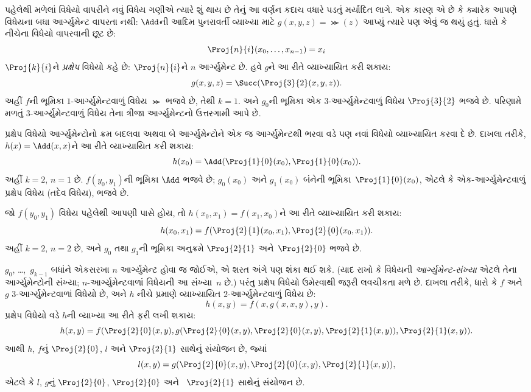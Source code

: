 
પહેલેથી મળેલાં વિધેયો વાપરીને નવું વિધેય ગણીએ ત્યારે શું થાય છે તેનું
આ વર્ણન કદાચ વધારે પડતું મર્યાદિત લાગે. એક કારણ એ છે કે ક્યારેક
આપણે વિધેયના બધા આર્ગ્યુમેન્ટ વાપરતા નથી: $\Add$ની આદિમ
પુનરાવર્તી વ્યાખ્યા માટે $g(x, y, z) = \Succ(z)$ આપ્યું ત્યારે પણ
એવું જ થયું હતું. ધારો કે નીચેના વિધેયો વાપરવાની છૂટ છે:
\[
\Proj{n}{i}(x_0, \dots, x_{n-1}) = x_i
\]
$\Proj{k}{i}$ને \emph{પ્રક્ષેપ} વિધેયો કહે છે:
$\Proj{n}{i}$ને $n$ આર્ગ્યુમેન્ટ છે. હવે $g$ને આ રીતે
વ્યાખ્યાયિત કરી શકાય:
\[
g(x, y, z) = \Succ(\Proj{3}{2}(x, y, z)).
\]
અહીં $f$ની ભૂમિકા $1$-આર્ગ્યુમેન્ટવાળું વિધેય $\Succ$ ભજવે છે,
તેથી $k=1$. અને $g_0$ની ભૂમિકા એક $3$-આર્ગ્યુમેન્ટવાળું વિધેય
$\Proj{3}{2}$ ભજવે છે. પરિણામે મળતું $3$-આર્ગ્યુમેન્ટવાળું વિધેય
તેના ત્રીજા આર્ગ્યુમેન્ટનો ઉત્તરગામી આપે છે.

પ્રક્ષેપ વિધેયો આર્ગ્યુમેન્ટોનો ક્રમ બદલવા અથવા બે આર્ગ્યુમેન્ટોને
એક જ આર્ગ્યુમેન્ટથી ભરવા વડે પણ નવાં વિધેયો વ્યાખ્યાયિત કરવા દે છે.
દાખલા તરીકે, $h(x) = \Add(x, x)$ને આ રીતે વ્યાખ્યાયિત કરી શકાય:
\[
h(x_0) = \Add(\Proj{1}{0}(x_0),\Proj{1}{0}(x_0)).
\]
અહીં $k=2$, $n=1$ છે. $f(y_0,y_1)$ની ભૂમિકા $\Add$ ભજવે છે;
$g_0(x_0)$ અને $g_1(x_0)$ બંનેની ભૂમિકા~$\Proj{1}{0}(x_0)$,
એટલે કે એક-આર્ગ્યુમેન્ટવાળું પ્રક્ષેપ વિધેય (તદેવ વિધેય), ભજવે છે.

જો $f(y_0, y_1)$ વિધેય પહેલેથી આપણી પાસે હોય, તો
$h(x_0, x_1) = f(x_1, x_0)$ને આ રીતે વ્યાખ્યાયિત કરી શકાય:
\[
h(x_0, x_1) = f(\Proj{2}{1}(x_0, x_1),\Proj{2}{0}(x_0, x_1)).
\]
અહીં $k=2$, $n = 2$ છે, અને $g_0$ તથા $g_1$ની ભૂમિકા અનુક્રમે
$\Proj{2}{1}$ અને~$\Proj{2}{0}$ ભજવે છે.

$g_0$, \dots,~$g_{k-1}$ બધાંને એકસરખા $n$ આર્ગ્યુમેન્ટ હોવા
જ જોઈએ, એ શરત અંગે પણ શંકા થઈ શકે. (યાદ રાખો કે વિધેયની
\emph{આર્ગ્યુમેન્ટ-સંખ્યા} એટલે તેના આર્ગ્યુમેન્ટોની સંખ્યા;
$n$-આર્ગ્યુમેન્ટવાળાં વિધેયની આ સંખ્યા~$n$ છે.) પરંતુ પ્રક્ષેપ
વિધેયો ઉમેરવાથી જરૂરી લવચીકતા મળે છે. દાખલા તરીકે, ધારો કે $f$
અને~$g$ $3$-આર્ગ્યુમેન્ટવાળાં વિધેયો છે, અને $h$ નીચે પ્રમાણે
વ્યાખ્યાયિત $2$-આર્ગ્યુમેન્ટવાળું વિધેય છે:
\[
h(x,y) = f(x,g(x,x,y),y).
\]
પ્રક્ષેપ વિધેયો વડે $h$ની વ્યાખ્યા આ રીતે ફરી લખી શકાય:
\[
h(x,y) = f(\Proj{2}{0}(x,y), g(\Proj{2}{0}(x,y), \Proj{2}{0}(x,y),
\Proj{2}{1}(x,y)), \Proj{2}{1}(x,y)).
\]
આથી $h$, $f$નું $\Proj{2}{0}$, $l$ અને $\Proj{2}{1}$ સાથેનું
સંયોજન છે, જ્યાં
\[
l(x,y) = g(\Proj{2}{0}(x,y),\Proj{2}{0}(x,y),\Proj{2}{1}(x,y)),
\]
એટલે કે $l$, $g$નું $\Proj{2}{0}$, $\Proj{2}{0}$ અને
~$\Proj{2}{1}$ સાથેનું સંયોજન છે.
\endgroup



